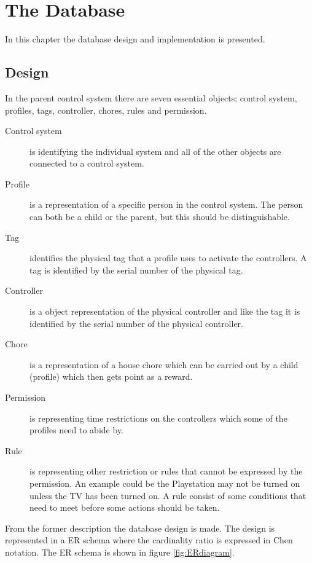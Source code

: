 \chapter{The Database}
In this chapter the database design and implementation is presented.  
\section{Design}
In the parent control system there are seven essential objects; control system, profiles, tags, controller, chores, rules and permission. 


\begin{description}
	\item[Control system] is identifying the individual system and all of the other objects are connected to a control system.
	\item[Profile] is a representation of a specific person in the control system. The person can both be a child or the parent, but this should be distinguishable.
	\item[Tag] identifies the physical tag that a profile uses to activate the controllers. A tag is identified by the serial number of the physical tag.
	\item[Controller]	is a object representation of the physical controller and like the tag it is identified by the serial number of the physical controller.
	\item[Chore] is a representation of a house chore which can be carried out by a child (profile) which then gets point as a reward.
	\item[Permission] is representing time restrictions on the controllers which some of the profiles need to abide by. 
	\item[Rule] is representing other restriction or rules that cannot be expressed by the permission. An example could be the Playstation may not be turned on unless the TV has been turned on. A rule consist of some conditions that need to meet before some actions should be taken. 
\end{description}

From the former description the database design is made. The design is represented in a ER schema where the cardinality ratio is expressed in 
Chen notation. The ER schema is shown in figure \ref{fig:ERdiagram}. 

